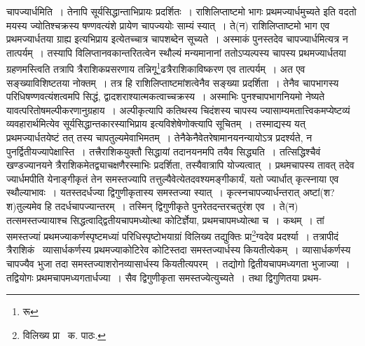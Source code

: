\documentclass[11pt, openany]{book}
\begin{document}
\noindent चापज्यार्धमिति~। तेनापि सूर्यसिद्धान्ताभिप्रायः प्रदर्शितः~। {\qt राशिलिप्ताष्टमो भागः प्रथमज्यार्धमुच्यते} इति वदतो मयस्य ज्योतिश्चक्रस्य षण्णवत्यंशे प्रायेण चापज्ययोः साम्यं स्यात्~। ते(न) राशिलिप्ताष्टमो भाग एव प्रथमज्यार्धतया ग्राह्य इत्यभिप्राय इत्येतच्चात्र चापशब्देन सूच्यते~। अस्माकं पुनस्तदेव चापज्यार्धमित्यत्र न तात्पर्यम्~। तस्यापि विलिप्तानवकान्तरितत्वेन स्थौल्यं मन्यमानानां ततोऽप्यल्पस्य चापस्य प्रथमज्यार्धतया ग्रहणमस्त्विति तत्रापि त्रैराशिकप्रसरणाय तन्निगू\renewcommand{\thefootnote}{२}\footnote{रू}ढत्रैराशिकाविष्करण एव तात्पर्यम्~। अत एव सङ्ख्याविशिष्टतया नोक्तम्~। तत्र हि राशिलिप्ताष्टमांशत्वेनैव सङ्ख्या प्रदर्शिता~। तेनैव चापभागस्य परिधिषण्णवत्यंशत्वमपि सिद्धं, द्वादशराश्यात्मकत्वाच्चक्रस्य~। अस्माभिः पुनश्चापभागनियमो नेष्यते यावत्परितोषमल्पीकरणानुग्रहाय~। अल्पीकृत्यापि कतिथस्य चिदंशस्य चापस्य ज्यासाम्यमतात्त्विकमप्येष्टव्यं व्यवहारार्थमित्येव सूर्यसिद्धान्तकारस्याभिप्राय इत्यविशेषेणोक्त्यापि सूचितम्~। तस्माद्यस्य यत् प्रथमज्यार्धतयेष्टं तत् तस्य चापतुल्यमेवाभिमतम्~। तेनैकेनैवेतरेषामानयनन्यायोऽत्र प्रदर्श्यते, न पुनर्द्वितीयज्यापेक्षास्ति~। तत्त्रैराशिकयुक्तौ सिद्धायां तदानयनमपि तयैव सिद्ध्यति~। तत्सिद्धिश्चैवं खण्डज्यानयने त्रैराशिकमेतद्व्याचक्षणैरस्माभिः प्रदर्शिता, तस्यैवात्रापि योज्यत्वात्~। प्रथमचापस्य तावत् तदेव ज्यार्धमपीति येनाङ्गीकृतं तेन समस्तज्यापि तत्तुल्यैवेत्येतदवश्यमङ्गीकार्यं, यतो ज्यार्धात् कृत्स्नाया एव स्थौल्याभावः~। यतस्तदर्धज्या द्विगुणीकृतास्य समस्तज्या स्यात्~। कृत्स्नचापज्यार्धन्तरात् अष्टां(श? श)तुल्यमेव हि तदर्धचापज्यान्तरम्~। तस्मिन् द्विगुणीकृते पुनरेतदन्तरचतुरंश एव~। ते(न) तत्समस्तज्यायाश्च सिद्धत्वाद्द्वितीयचापमध्योत्था कोटिर्ज्ञेया, प्रथमचापमध्योत्था च~। कथम्~। तां समस्तज्यां प्रथमज्याकर्णस्पृष्टमध्यां परिधिस्पृष्टोभयाग्रां विलिख्य तद्युक्तिः प्रा\renewcommand{\thefootnote}{२}\footnote{विलिख्य प्रा \textendash\ क. पाठः.}ग्वदेव प्रदर्श्या~। तत्रापीदं त्रैराशिकं \textendash\ व्यासार्धकर्णस्य प्रथमज्याकोटिरेव कोटिस्तदा समस्तज्यार्धस्य कियतीत्येकम्~।
व्यासार्धकर्णस्य चापज्यैव भुजा तदा समस्तज्याशरोनव्यासार्धस्य कियतीत्यपरम्~। तद्योगो द्वितीयचापमध्यगता भुजाज्या~। तद्वियोगः
प्रथमचापमध्यगतार्धज्या~। सैव द्विगुणीकृता समस्तज्येत्युच्यते~। तथा द्विगुणितया प्रथम-

\newpage
\end{document}

